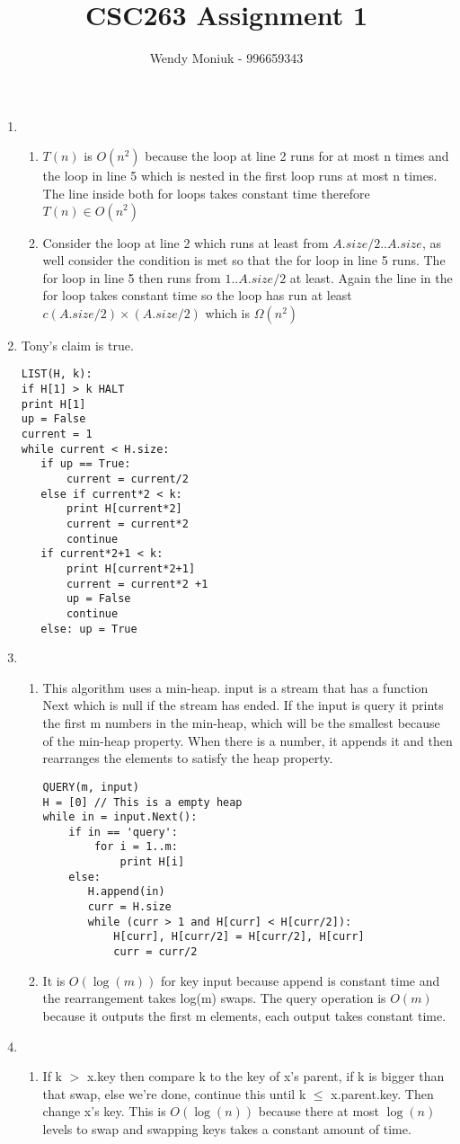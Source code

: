 \documentclass[10pt,a4paper]{article}
\author{Wendy Moniuk - 996659343}
\title{CSC263 Assignment 1}
\begin{document}
\begin{enumerate}
\item \begin{enumerate}
\item $T(n)$ is 
$O(n^2)$ because the loop at line 2 runs for at most n times and the loop in line 5 which is nested in the first loop runs at most n times. The line inside both for loops takes constant time therefore $T(n) \in O(n^2)$
\item Consider the loop at line 2 which runs at least from $A.size/2 .. A.size$, as well consider the condition is met so that the for loop in line 5 runs. The for loop in line 5 then runs from $1 .. A.size/2$ at least. Again the line in the for loop takes constant time so the loop has run at least $c(A.size/2) \times (A.size/2)$ which is $\Omega(n^2)$ 
\end{enumerate}
\item Tony's claim is true.
\begin{verbatim}
LIST(H, k):
if H[1] > k HALT
print H[1]
up = False
current = 1
while current < H.size:
   if up == True:
       current = current/2
   else if current*2 < k:
       print H[current*2]
       current = current*2 
       continue
   if current*2+1 < k: 
       print H[current*2+1]  
       current = current*2 +1
       up = False  
       continue  
   else: up = True
\end{verbatim}
\item 
\begin{enumerate}
\item
This algorithm uses a min-heap. input is a stream that has a function Next which is null if the stream has ended. If the input is query it prints the first m numbers in the min-heap, which will be the smallest because of the min-heap property. When there is a number, it appends it and then rearranges the elements to satisfy the heap property.
\begin{verbatim}
QUERY(m, input)
H = [0] // This is a empty heap
while in = input.Next():
    if in == 'query':
        for i = 1..m:
            print H[i]
    else:
       H.append(in)
       curr = H.size
       while (curr > 1 and H[curr] < H[curr/2]):
           H[curr], H[curr/2] = H[curr/2], H[curr]
           curr = curr/2
\end{verbatim}
\item It is $O(\log(m))$ for key input because append is constant time and the rearrangement takes log(m) swaps. The query operation is $O(m)$ because it outputs the first m elements, each output takes constant time. 
\end{enumerate}
\item
\begin{enumerate}
\item If k $>$ x.key then compare k to the key of x's parent, if k is bigger than that swap, else we're done, continue this until 
k $\leq$ x.parent.key. Then change x's key. This is 
$O(\log(n))$ because there at most 
$\log(n)$ levels to swap and swapping keys takes a constant amount of time.


\end{enumerate}
\end{enumerate}
\end{document}
